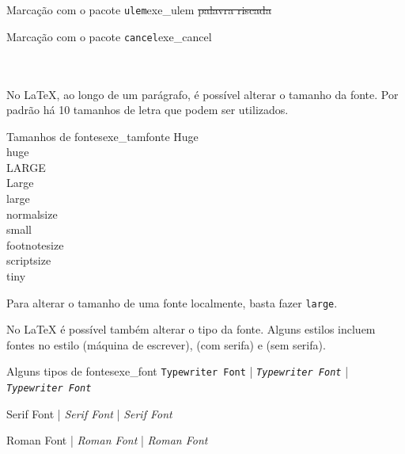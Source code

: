 \begin{texexptitled}[breakable,center lower,enhanced,middle=2mm,listing side text]{Marcação com o pacote \texttt{ulem}}{exe_ulem}
\sout{palavra riscada}
\end{texexptitled}

\begin{texexptitled}[breakable,center lower,enhanced,middle=2mm,listing side text]{Marcação com o pacote \texttt{cancel}}{exe_cancel}
 \\
 \\
 \\
\end{texexptitled}

No LaTeX, ao longo de um parágrafo, é possível alterar o tamanho da fonte. Por padrão há 10 tamanhos de letra que podem ser utilizados.

\begin{texexptitled}[breakable,center lower,enhanced,middle=2mm,listing side text]{Tamanhos de fontes}{exe_tamfonte}
\Huge Huge \\
\huge huge \\
\LARGE LARGE \\
\Large Large \\
\large large \\
\normalsize normalsize \\
\small small \\
\footnotesize footnotesize \\
\scriptsize scriptsize \\
\tiny tiny
\end{texexptitled}

Para alterar o tamanho de uma fonte localmente, basta fazer \texttt{\large large}.

No LaTeX é possível também alterar o tipo da fonte. Alguns estilos incluem fontes no estilo \texttt{\texttt{}} (máquina de escrever), \texttt{\textsf{}} (com serifa) e \texttt{\textrm{}} (sem serifa).

\begin{texexptitled}[breakable,center lower,enhanced,middle=2mm]{Alguns tipos de fontes}{exe_font}
\texttt{Typewriter Font} | 
\texttt{\textit{Typewriter Font}} |
\texttt{\textsl{Typewriter Font}}

\textsf{Serif Font} | 
\textsf{\textit{Serif Font}} | 
\textsf{\textsl{Serif Font}}

\textrm{Roman Font} | 
\textrm{\textit{Roman Font}} | 
\textrm{\textsl{Roman Font}}
\end{texexptitled}

